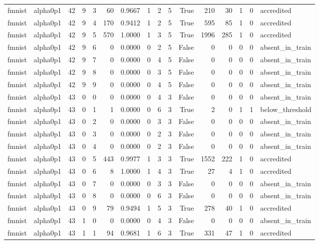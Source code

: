 \begin{tabular}{llrrrrrrrrrrrrrl}
fmnist & alpha0p1 & 42 & 9 & 3 & 60 & 0.9667 & 1 & 2 & 5 & True & 210 & 30 & 1 & 0 & accredited \\
fmnist & alpha0p1 & 42 & 9 & 4 & 170 & 0.9412 & 1 & 2 & 5 & True & 595 & 85 & 1 & 0 & accredited \\
fmnist & alpha0p1 & 42 & 9 & 5 & 570 & 1.0000 & 1 & 3 & 5 & True & 1996 & 285 & 1 & 0 & accredited \\
fmnist & alpha0p1 & 42 & 9 & 6 & 0 & 0.0000 & 0 & 2 & 5 & False & 0 & 0 & 0 & 0 & absent\_in\_train \\
fmnist & alpha0p1 & 42 & 9 & 7 & 0 & 0.0000 & 0 & 4 & 5 & False & 0 & 0 & 0 & 0 & absent\_in\_train \\
fmnist & alpha0p1 & 42 & 9 & 8 & 0 & 0.0000 & 0 & 3 & 5 & False & 0 & 0 & 0 & 0 & absent\_in\_train \\
fmnist & alpha0p1 & 42 & 9 & 9 & 0 & 0.0000 & 0 & 4 & 5 & False & 0 & 0 & 0 & 0 & absent\_in\_train \\
fmnist & alpha0p1 & 43 & 0 & 0 & 0 & 0.0000 & 0 & 4 & 3 & False & 0 & 0 & 0 & 0 & absent\_in\_train \\
fmnist & alpha0p1 & 43 & 0 & 1 & 1 & 0.0000 & 0 & 6 & 3 & True & 2 & 0 & 1 & 1 & below\_threshold \\
fmnist & alpha0p1 & 43 & 0 & 2 & 0 & 0.0000 & 0 & 3 & 3 & False & 0 & 0 & 0 & 0 & absent\_in\_train \\
fmnist & alpha0p1 & 43 & 0 & 3 & 0 & 0.0000 & 0 & 2 & 3 & False & 0 & 0 & 0 & 0 & absent\_in\_train \\
fmnist & alpha0p1 & 43 & 0 & 4 & 0 & 0.0000 & 0 & 2 & 3 & False & 0 & 0 & 0 & 0 & absent\_in\_train \\
fmnist & alpha0p1 & 43 & 0 & 5 & 443 & 0.9977 & 1 & 3 & 3 & True & 1552 & 222 & 1 & 0 & accredited \\
fmnist & alpha0p1 & 43 & 0 & 6 & 8 & 1.0000 & 1 & 4 & 3 & True & 27 & 4 & 1 & 0 & accredited \\
fmnist & alpha0p1 & 43 & 0 & 7 & 0 & 0.0000 & 0 & 3 & 3 & False & 0 & 0 & 0 & 0 & absent\_in\_train \\
fmnist & alpha0p1 & 43 & 0 & 8 & 0 & 0.0000 & 0 & 6 & 3 & False & 0 & 0 & 0 & 0 & absent\_in\_train \\
fmnist & alpha0p1 & 43 & 0 & 9 & 79 & 0.9494 & 1 & 5 & 3 & True & 278 & 40 & 1 & 0 & accredited \\
fmnist & alpha0p1 & 43 & 1 & 0 & 0 & 0.0000 & 0 & 4 & 3 & False & 0 & 0 & 0 & 0 & absent\_in\_train \\
fmnist & alpha0p1 & 43 & 1 & 1 & 94 & 0.9681 & 1 & 6 & 3 & True & 331 & 47 & 1 & 0 & accredited \\

\end{tabular}
